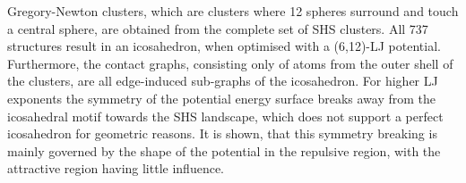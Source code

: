 Gregory-Newton clusters, which are clusters where 12 spheres surround and touch
a central sphere, are obtained from the complete set of SHS clusters. All 737
structures result in an icosahedron, when optimised with a (6,12)-LJ potential.
Furthermore, the contact graphs, consisting only of atoms from the outer shell
of the clusters, are all edge-induced sub-graphs of the icosahedron. For higher
LJ exponents the symmetry of the potential energy surface breaks away from the
icosahedral motif towards the SHS landscape, which does not support a perfect
icosahedron for geometric reasons. It is shown, that this symmetry breaking is
mainly governed by the shape of the potential in the repulsive region, with the
attractive region having little influence.



